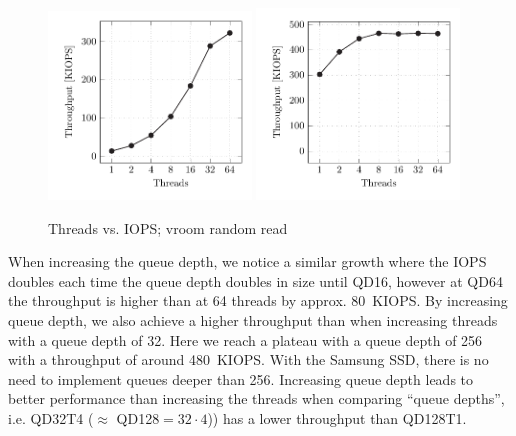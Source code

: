 \begin{figure}[H]
  \centering
   {\includegraphics[width=0.48\textwidth]{figures/vroom-iops-thread} \label{fig:vroom-iops-thread-qd1}}
   {\includegraphics[width=0.48\textwidth]{figures/vroom-iops-thread-qd32} \label{fig:vroom-iops-thread-qd32}}
  \caption{Threads vs. IOPS; vroom random read}
  \label{fig:vroom-iops-thread}
\end{figure}

When increasing the queue depth, we notice a similar growth where the IOPS doubles each time the queue depth doubles in size until QD16, however at QD64 the throughput is higher than at 64 threads by approx. \qty{80}{KIOPS}. By increasing queue depth, we also achieve a higher throughput than when increasing threads with a queue depth of 32. Here we reach a plateau with a queue depth of 256 with a throughput of around \qty{480}{KIOPS}. With the Samsung SSD, there is no need to implement queues deeper than 256. Increasing queue depth leads to better performance than increasing the threads when comparing ``queue depths'', i.e. QD32T4 ($\approx$ QD128$=32 \cdot 4$)) has a lower throughput than QD128T1.

